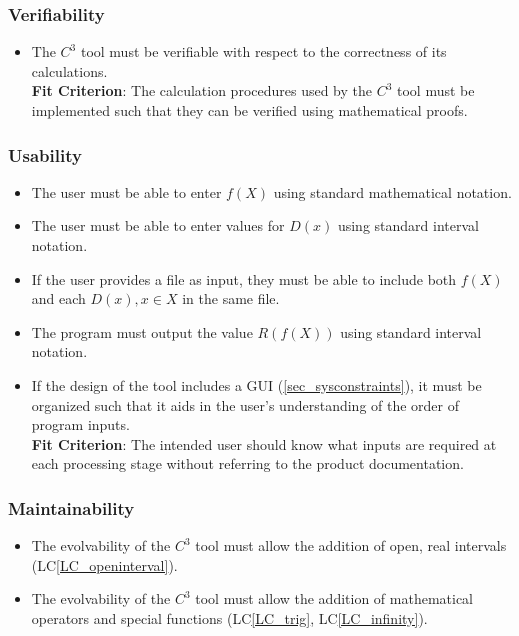 \documentclass[12pt]{article}
\newcommand{\lcref}[1]{LC\ref{#1}}
\newcommand{\prognameAbbrv}{$C^{3}$}
\begin{document}
\subsubsection*{Verifiability}
\begin{itemize}
	\item The \prognameAbbrv{} tool must be verifiable with respect to the 
	correctness of its calculations.\\ \textbf{Fit Criterion}: The calculation 
	procedures used by the \prognameAbbrv{} tool must be implemented such that 
	they can be verified using mathematical proofs.
\end{itemize}

\subsubsection*{Usability}
\begin{itemize}
	\item The user must be able to enter $f(X)$ using standard mathematical 
	notation.
	\item The user must be able to enter values for $D(x)$ using standard 
	interval notation.
	\item If the user provides a file as input, they must be able to include 
	both $f(X)$ and each $D(x), x \in X$ in the same file.
	\item The program must output the value $R(f(X))$ using standard interval 
	notation.
	\item If the design of the tool includes a GUI (\ref{sec_sysconstraints}), 
	it must be organized such that it aids in the user's understanding of the 
	order of program inputs.\\\textbf{Fit Criterion}: The intended user should 
	know what inputs are required at each processing stage without referring to 
	the product documentation.
\end{itemize}

\subsubsection*{Maintainability}
\begin{itemize}
	\item The evolvability of the \prognameAbbrv{} tool must allow the addition 
	of open, real intervals (\lcref{LC_openinterval}).
	\item The evolvability of the \prognameAbbrv{} tool must allow the addition 
	of mathematical operators and special functions (\lcref{LC_trig}, 
	\lcref{LC_infinity}).
\end{itemize}
\end{document}

